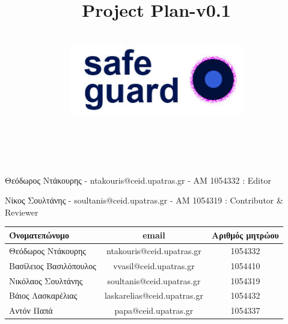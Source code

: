 \documentclass{article}
\title{Project Plan-v0.1}
\author{\\
\includegraphics[width=3in]{safeguard}\\[1ex]\\\\
}
\begin{document}
\maketitle

\newpage


Θεόδωρος Ντάκουρης - ntakouris@ceid.upatras.gr - ΑΜ 1054332 : Editor 

Νίκος Σουλτάνης - soultanis@ceid.upatras.gr - ΑΜ 1054319 : Contributor & Reviewer

\begin{tabular}{|l|c|c|}
\hline
Όνοματεπώνυμο & email & Αριθμός μητρώου  \\
\hline
Θεόδωρος Ντάκουρης & ntakouris@ceid.upatras.gr & 1054332 \\
Βασίλειος Βασιλόπουλος & vvasil@ceid.upatras.gr &  1054410\\
Νικόλαος Σουλτάνης & soultanis@ceid.upatras.gr & 1054319  \\
Βάιος Λασκαρέλιας & laskarelias@ceid.upatras.gr & 1054432 \\
Αντόν Παπά & papa@ceid.upatras.gr & 1054337 \\
\hline
\end{tabular}

\renewcommand{\contentsname}{Περιεχόμενα}
\tableofcontents
\end{document}
